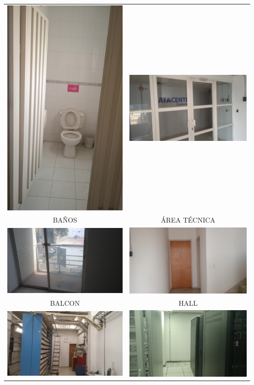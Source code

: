\documentclass[12pt,a4paper,twoside]{article}
\begin{document}
\begin{tabular}{ c c }
	
	\includegraphics[width = 3 cm]{Imagenes/17} & \includegraphics[width = 7 cm]{Imagenes/18} \\
    BAÑOS & ÁREA TÉCNICA \\
	\includegraphics[width = 7 cm]{Imagenes/19} & \includegraphics[width = 7 cm]{Imagenes/20} \\
	BALCON & HALL\\
	\includegraphics[width = 7 cm]{Imagenes/21} & \includegraphics[width = 7 cm]{Imagenes/22} \\

\end{tabular}
\end{document}
